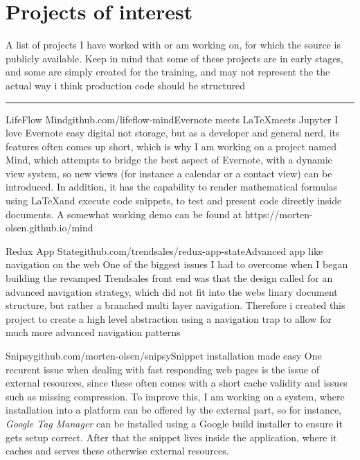 \begin{cvskills}
\end{cvskills}

\section*{Projects of interest}
A list of projects I have worked with or am working on, for which the source is publicly available. Keep in mind that some of these projects are in early stages, and some are simply created for the training, and may not represent the the actual way i think production code should be structured\\
\hrule

\begin{cvproj}{LifeFlow Mind}{github.com/lifeflow-mind}{Evernote meets \LaTeX meets Jupyter}
	I love Evernote easy digital not storage, but as a developer and general nerd, its features often comes up short, which is why I am working on a project named Mind, which attempts to bridge the best aspect of Evernote, with a dynamic view system, so new views (for instance a calendar or a contact view) can be introduced. In addition, it has the capability to render mathematical formulas using \LaTeX and execute code snippets, to test and present code directly inside documents. A somewhat working demo can be found at https://morten-olsen.github.io/mind
\end{cvproj}

\begin{cvproj}{Redux App State}{github.com/trendsales/redux-app-state}{Advanced app like navigation on the web}
	One of the biggest issues I had to overcome when I began building the revamped Trendsales front end was that the design called for an advanced navigation strategy, which did not fit into the webs linary document structure, but rather a branched multi layer navigation. Therefore i created this project to create a high level abstraction using a navigation trap to allow for much more advanced navigation patterns
\end{cvproj}

\begin{cvproj}{Snipsy}{github.com/morten-olsen/snipsy}{Snippet installation made easy}
	One recurent issue when dealing with fast responding web pages is the issue of external resources, since these often comes with a short cache validity and issues such as missing compression. To improve this, I am working on a system, where installation into a platform can be offered by the external part, so for instance, \textit{Google Tag Manager} can be installed using a Google build installer to ensure it gets setup correct. After that the snippet lives inside the application, where it caches and serves these otherwise external resources.
\end{cvproj}

